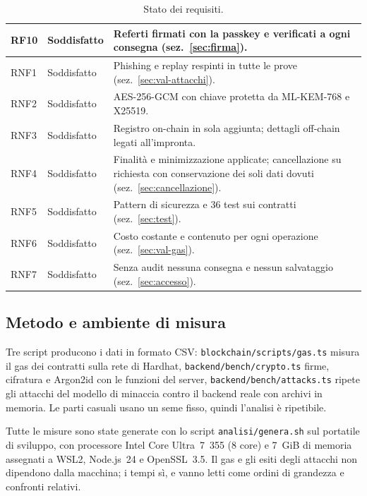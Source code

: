 \begin{table}[H]
\begin{tabular}{@{}p{}p{}p{}@{}}
RF10 & Soddisfatto & Referti firmati con la passkey e verificati a ogni consegna (sez.~\ref{sec:firma}).\\
\midrule
RNF1 & Soddisfatto & Phishing e replay respinti in tutte le prove (sez.~\ref{sec:val-attacchi}).\\
RNF2 & Soddisfatto & AES-256-GCM con chiave protetta da ML-KEM-768 e X25519.\\
RNF3 & Soddisfatto & Registro on-chain in sola aggiunta; dettagli off-chain legati all'impronta.\\
RNF4 & Soddisfatto & Finalità e minimizzazione applicate; cancellazione su richiesta con conservazione dei soli dati dovuti (sez.~\ref{sec:cancellazione}).\\
RNF5 & Soddisfatto & Pattern di sicurezza e 36 test sui contratti (sez.~\ref{sec:test}).\\
RNF6 & Soddisfatto & Costo costante e contenuto per ogni operazione (sez.~\ref{sec:val-gas}).\\
RNF7 & Soddisfatto & Senza audit nessuna consegna e nessun salvataggio (sez.~\ref{sec:accesso}).\\
\bottomrule
\end{tabular}
\caption{Stato dei requisiti.}
\end{table}

\subsection{Metodo e ambiente di misura}
Tre script producono i dati in formato CSV: \texttt{blockchain/scripts/gas.ts} misura il gas dei contratti sulla rete di Hardhat, \texttt{backend/bench/crypto.ts} firme, cifratura e Argon2id con le funzioni del server, \texttt{backend/bench/attacks.ts} ripete gli attacchi del modello di minaccia contro il backend reale con archivi in memoria. Le parti casuali usano un seme fisso, quindi l'analisi è ripetibile.

Tutte le misure sono state generate con lo script \texttt{analisi/genera.sh} sul portatile di sviluppo, con processore Intel Core Ultra~7~355 (8 core) e 7~GiB di memoria assegnati a WSL2, Node.js~24 e OpenSSL~3.5. Il gas e gli esiti degli attacchi non dipendono dalla macchina; i tempi sì, e vanno letti come ordini di grandezza e confronti relativi.

